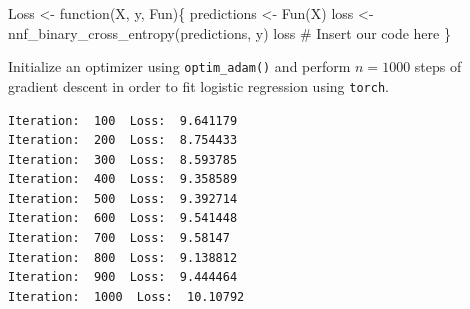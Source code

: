 \documentclass[
  letterpaper,
  DIV=11,
  numbers=noendperiod]{scrartcl}
\newenvironment{Shaded}{\begin{snugshade}}{\end{snugshade}}
\newcommand{\AttributeTok}[1]{\textcolor[rgb]{0.40,0.45,0.13}{#1}}
\newcommand{\CommentTok}[1]{\textcolor[rgb]{0.37,0.37,0.37}{#1}}
\newcommand{\ControlFlowTok}[1]{\textcolor[rgb]{0.00,0.23,0.31}{#1}}
\newcommand{\DecValTok}[1]{\textcolor[rgb]{0.68,0.00,0.00}{#1}}
\newcommand{\FloatTok}[1]{\textcolor[rgb]{0.68,0.00,0.00}{#1}}
\newcommand{\FunctionTok}[1]{\textcolor[rgb]{0.28,0.35,0.67}{#1}}
\newcommand{\NormalTok}[1]{\textcolor[rgb]{0.00,0.23,0.31}{#1}}
\newcommand{\OtherTok}[1]{\textcolor[rgb]{0.00,0.23,0.31}{#1}}
\newcommand{\SpecialCharTok}[1]{\textcolor[rgb]{0.37,0.37,0.37}{#1}}
\newcommand{\StringTok}[1]{\textcolor[rgb]{0.13,0.47,0.30}{#1}}
\begin{document}
\begin{Shaded}
\begin{Highlighting}[]
\NormalTok{Loss }\OtherTok{\textless{}{-}} \ControlFlowTok{function}\NormalTok{(X, y, Fun)\{}
\NormalTok{  predictions }\OtherTok{\textless{}{-}} \FunctionTok{Fun}\NormalTok{(X)}
\NormalTok{  loss }\OtherTok{\textless{}{-}} \FunctionTok{nnf\_binary\_cross\_entropy}\NormalTok{(predictions, y)}
\NormalTok{  loss }\CommentTok{\# Insert our code here}
\NormalTok{\}}
\end{Highlighting}
\end{Shaded}

Initialize an optimizer using \texttt{optim\_adam()} and perform
\(n=1000\) steps of gradient descent in order to fit logistic regression
using \texttt{torch}.

\begin{Shaded}
\end{Shaded}

\begin{verbatim}
Iteration:  100  Loss:  9.641179 
Iteration:  200  Loss:  8.754433 
Iteration:  300  Loss:  8.593785 
Iteration:  400  Loss:  9.358589 
Iteration:  500  Loss:  9.392714 
Iteration:  600  Loss:  9.541448 
Iteration:  700  Loss:  9.58147 
Iteration:  800  Loss:  9.138812 
Iteration:  900  Loss:  9.444464 
Iteration:  1000  Loss:  10.10792 
\end{verbatim}
\end{document}
